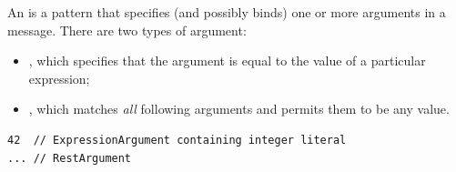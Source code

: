 An \margument{} is a pattern that specifies (and possibly binds) one or more
arguments in
a message.  There are two types of argument:

\begin{itemize}
\item
  \mexpressionargument, which specifies that the argument is equal to the
  value of a particular \robochart{} expression;
\item
  \mrestargument, which matches \emph{all} following arguments and permits
  them to be any value.
\end{itemize}

\begin{lstlisting}[style=Example]
42  // ExpressionArgument containing integer literal
... // RestArgument
\end{lstlisting}

